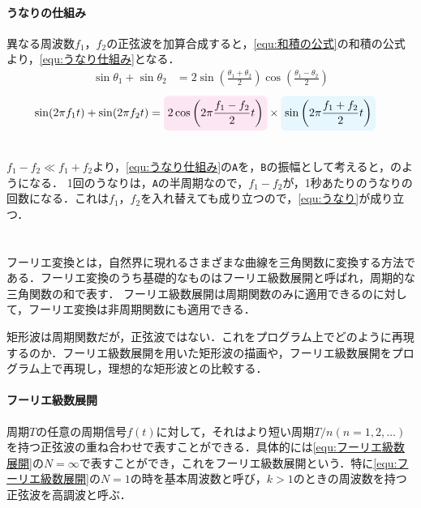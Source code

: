 \paragraph{うなりの仕組み}
異なる周波数\(f_1\)，\(f_2\)の正弦波を加算合成すると，\eqref{equ:和積の公式}の和積の公式より，\eqref{equ:うなり仕組み}となる．
\begin{align}
    \sin\theta_1+\sin\theta_2 & =2\sin\left(\frac{\theta_1+\theta_2}{2}\right)\cos\left(\frac{\theta_1-\theta_2}{2}\right)\label{equ:和積の公式}
\end{align}
\begin{align}
    \sin(2\pi f_1t)+\sin(2\pi f_2t) & =\tikz[remember picture,baseline=(co.base)]{\node[fill=magenta!10,rounded corners](co){\(2\cos\left(2\pi\dfrac{f_1-f_2}{2}t\right)\)}}\times\tikz[remember picture,baseline=(sn.base)]{\node[fill=cyan!10,rounded corners](sn){\(\sin\left(2\pi\dfrac{f_1+f_2}{2}t\right)\)}}\label{equ:うなり仕組み}
\end{align}
\\
\(f_1-f_2\ll f_1+f_2\)より，\eqref{equ:うなり仕組み}の\texttt{A}を，\texttt{B}の振幅として考えると，のようになる．
1回のうなりは，\texttt{A}の半周期なので，\(f_1-f_2\)が，1秒あたりのうなりの回数になる．これは\(f_1\)，\(f_2\)を入れ替えても成り立つので，\eqref{equ:うなり}が成り立つ．
\section{\kadaiad}\label{sec:\kadaiad}
\purpose
フーリエ変換とは，自然界に現れるさまざまな曲線を三角関数に変換する方法である．フーリエ変換のうち基礎的なものはフーリエ級数展開と呼ばれ，周期的な三角関数の和で表す．
フーリエ級数展開は周期関数のみに適用できるのに対して，フーリエ変換は非周期関数にも適用できる\cite[p.410]{かたち創造の百科事典}．\par
矩形波は周期関数だが，正弦波ではない．これをプログラム上でどのように再現するのか．フーリエ級数展開を用いた矩形波の描画や，フーリエ級数展開をプログラム上で再現し，理想的な矩形波との比較する．
\method
\paragraph{フーリエ級数展開}周期\(T\)の任意の周期信号\(f(t)\)に対して，それはより短い周期\(T/n(n=1,2,\dots)\)を持つ正弦波の重ね合わせで表すことができる．具体的には\eqref{equ:フーリエ級数展開}の\(N=\infty\)で表すことができ，これをフーリエ級数展開という\cite[p.18\ -\ p.19]{信号処理}．特に\eqref{equ:フーリエ級数展開}の\(N=1\)の時を基本周波数と呼び，\(k>1\)のときの周波数を持つ正弦波を高調波と呼ぶ．

